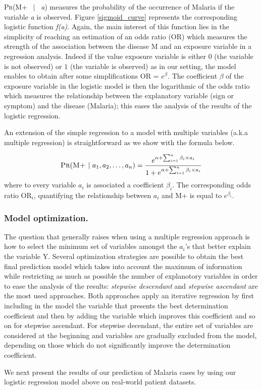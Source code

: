 \textsc{Pr}(\textsc{M+} ~$|$~ \emph{a}) measures the probability of the occurrence of Malaria if the variable \emph{a} is observed.
Figure \ref{sigmoid_curve} represents the corresponding logistic function \emph{f(a)}. Again, the main interest of this function
lies in the simplicity of reaching an estimation of an odds ratio (OR) which measures the strength of the association between the 
disease \textsc{M} and an exposure variable in a regression analysis. Indeed if the value exposure variable is either $0$ (the variable is not observed)
or $1$ (the variable is observed) as in our setting, the model enables to obtain after some simplifications OR = $e^{\beta}$. The coefficient $\beta$ 
of the exposure variable in the logistic model is then the logarithmic of the odds ratio which measures the relationship between the explanatory variable 
(sign or symptom) and the disease (Malaria); this eases the analysis of the results of the logistic regression. 

An extension of the simple regression to a model with multiple variables (a.k.a multiple regression) is straightforward as we show with the formula below.

\begin{equation}
\textsc{Pr}(\textsc{M+} ~|~ \emph{$a_1$},\emph{$a_2$}, \ldots, \emph{$a_n$}) = \frac{e^{\alpha + \sum_{i=1}^{n} \beta_i \times \emph{$a_i$} }}{1 + e^{\alpha + \sum_{i=1}^{n} \beta_i \times \emph{$a_i$} }}
\label{multiple_regression}
\end{equation} 
where to every variable \emph{$a_i$} is associated a coefficient $\beta_i$. The corresponding odds ratio OR$_i$, quantifying the relationship between \emph{$a_i$} and \textsc{M+} is equal to $e^{\beta_i}$.

\subsubsection{Model optimization.}
The question that generally raises when using a multiple regression approach is how to select the minimum set of variables amongst the \emph{$a_i$}'s that better explain the variable \textsc{Y}.  
Several optimization strategies are possible to obtain the best final prediction model which takes into account the maximum of information
while restricting as much as possible the number of explanotory variables in order to ease the analysis of the results:
\emph{stepwise descendant} and \emph{stepwise ascendant} are the most used approaches. Both approaches apply an iterative 
regression by first including in the model the variable that presents the best determination coefficient and then by adding the
variable which improves this coefficient and so on for stepwise ascendant. For stepwise decendant, the entire set of variables are considered at the beginning and variables are gradually excluded
from the model, depending on those which do not significantly improve the determination coefficient.

We next present the results of our prediction of Malaria cases by using our logistic regression model above on real-world patient datasets.    
